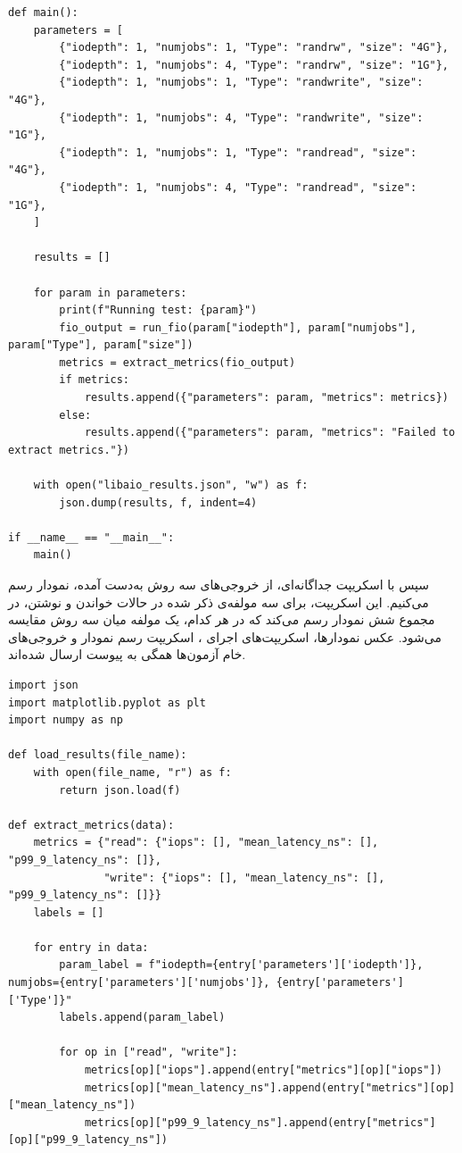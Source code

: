 \documentclass[12pt]{article}
\begin{document}
{\begin{latin}
\begin{lstlisting}
def main():
    parameters = [
        {"iodepth": 1, "numjobs": 1, "Type": "randrw", "size": "4G"},
        {"iodepth": 1, "numjobs": 4, "Type": "randrw", "size": "1G"},
        {"iodepth": 1, "numjobs": 1, "Type": "randwrite", "size": "4G"},
        {"iodepth": 1, "numjobs": 4, "Type": "randwrite", "size": "1G"},
        {"iodepth": 1, "numjobs": 1, "Type": "randread", "size": "4G"},
        {"iodepth": 1, "numjobs": 4, "Type": "randread", "size": "1G"},
    ]
    
    results = []
    
    for param in parameters:
        print(f"Running test: {param}")
        fio_output = run_fio(param["iodepth"], param["numjobs"], param["Type"], param["size"])
        metrics = extract_metrics(fio_output)
        if metrics:
            results.append({"parameters": param, "metrics": metrics})
        else:
            results.append({"parameters": param, "metrics": "Failed to extract metrics."})
    
    with open("libaio_results.json", "w") as f:
        json.dump(results, f, indent=4)
    
if __name__ == "__main__":
    main()
\end{lstlisting}
\end{latin}

سپس با اسکریپت جداگانه‌ای، از خروجی‌های سه روش به‌دست آمده، نمودار رسم می‌کنیم. این اسکریپت، برای سه مولفه‌ی ذکر شده در حالات خواندن و نوشتن، در مجموع شش نمودار رسم می‌کند که در هر کدام، یک مولفه میان سه روش  مقایسه می‌شود. عکس نمودارها، اسکریپت‌های اجرای ، اسکریپت رسم نمودار و خروجی‌های خام آزمون‌ها همگی به پیوست ارسال شده‌اند.
\begin{latin}
\begin{lstlisting}
import json
import matplotlib.pyplot as plt
import numpy as np

def load_results(file_name):
    with open(file_name, "r") as f:
        return json.load(f)

def extract_metrics(data):
    metrics = {"read": {"iops": [], "mean_latency_ns": [], "p99_9_latency_ns": []},
               "write": {"iops": [], "mean_latency_ns": [], "p99_9_latency_ns": []}}
    labels = []
    
    for entry in data:
        param_label = f"iodepth={entry['parameters']['iodepth']}, numjobs={entry['parameters']['numjobs']}, {entry['parameters']['Type']}"
        labels.append(param_label)
        
        for op in ["read", "write"]:
            metrics[op]["iops"].append(entry["metrics"][op]["iops"])
            metrics[op]["mean_latency_ns"].append(entry["metrics"][op]["mean_latency_ns"])
            metrics[op]["p99_9_latency_ns"].append(entry["metrics"][op]["p99_9_latency_ns"])
    

\end{lstlisting}
\end{latin}}
\end{document}
